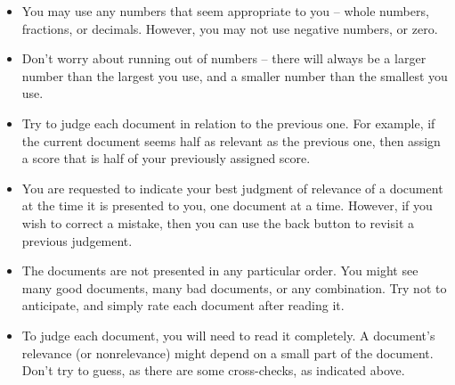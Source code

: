 \begin{itemize}
\item You may use any numbers that seem appropriate to you -- whole numbers,
  fractions, or decimals. However, you may not use negative numbers, or
  zero. 

\item Don't worry about running out of numbers -- there will always be a
  larger number than the largest you use, and a smaller number than the
  smallest you use.

\item Try to judge each document in relation to the previous one. For
  example, if the current document seems half as relevant as the
  previous one, then assign a score that is half of your previously
  assigned score. 

\item You are requested to indicate your best judgment of relevance of a
  document at the time it is presented to you, one document at a
  time. However, if you wish to correct a mistake, then you can use
  the back button to revisit a previous judgement.

\item The documents are not presented in any particular order. You might see
  many good documents, many bad documents, or any combination. Try not to
  anticipate, and simply rate each document after reading it.

\item To judge each document, you will need to read it completely.  A
  document's relevance (or nonrelevance) might depend on a small part of
  the document. Don't try to guess, as there are some cross-checks, as
  indicated above.
\end{itemize}

